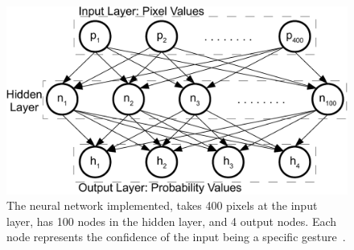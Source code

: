 \begin{figure}
\centering
\includegraphics[width=\columnwidth]{ch5/figs/neural_net-crop.pdf}
\caption{The neural network implemented, takes 400 pixels at the input layer,
has 100 nodes in the hidden layer, and 4 output nodes. Each node represents
the confidence of the input being a specific gesture~\cite{lo2013augmediated}.}
\label{neural_net}
\end{figure}

